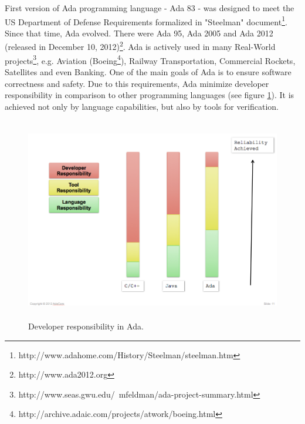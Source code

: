 First version of Ada programming language - Ada 83 - was designed to meet the US Department of Defense Requirements formalized in "Steelman" document\footnote{http://www.adahome.com/History/Steelman/steelman.htm}. Since that time, Ada evolved. There were Ada 95, Ada 2005 and Ada 2012 (released in December 10, 2012)\footnote{http://www.ada2012.org}. Ada is actively used in many Real-World projects\footnote{http://www.seas.gwu.edu/~mfeldman/ada-project-summary.html}, e.g. Aviation (Boeing\footnote{http://archive.adaic.com/projects/atwork/boeing.html}), Railway Transportation, Commercial Rockets, Satellites and even Banking. One of the main goals of Ada is to ensure software correctness and safety. Due to this requirements, Ada minimize developer responsibility in comparison to other programming languages (see figure \ref{figure:developer-responsibility-in-ada}). It is achieved not only by language capabilities, but also by tools for verification. 

\begin{figure}[ht]%
    \begin{center}
    	\includegraphics[height=3.5in]{figures/developer_responsibility_in_ada.png}    	
    \end{center}
    \caption{Developer responsibility in Ada\protect\footnotemark. }
    \label{figure:developer-responsibility-in-ada}
\end{figure}

